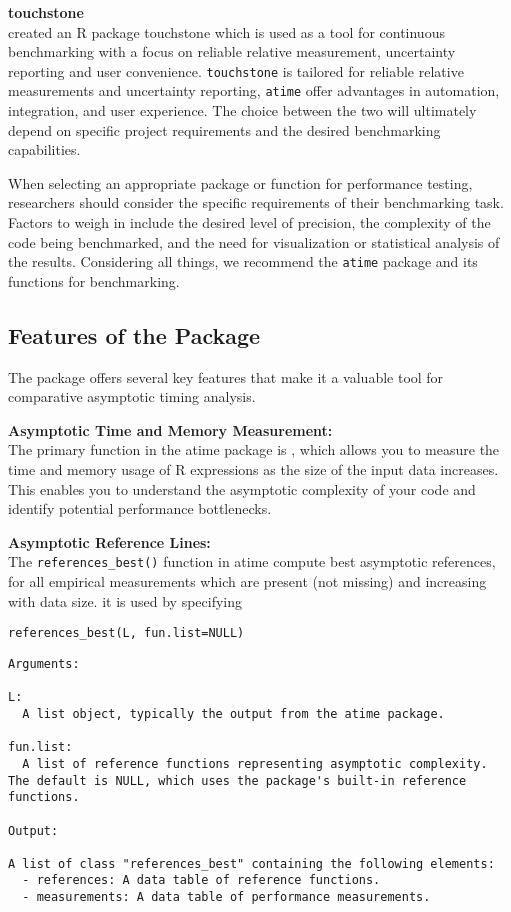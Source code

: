 \textbf{touchstone} \\
\citet{touchstone} created an R package touchstone which is used as a tool for continuous benchmarking with a focus on reliable relative measurement, uncertainty reporting and user convenience. \texttt{touchstone} is tailored for reliable relative measurements and uncertainty reporting, \texttt{atime} offer advantages in automation, integration, and user experience. The choice between the two will ultimately depend on specific project requirements and the desired benchmarking capabilities.

    
\noindent When selecting an appropriate package or function for performance testing, researchers should consider the specific requirements of their benchmarking task. Factors to weigh in include the desired level of precision, the complexity of the code being benchmarked, and the need for visualization or statistical analysis of the results. Considering all things, we recommend the \texttt{atime} package and its functions for benchmarking.

\subsection{Features of the Package}
The package offers several key features that make it a valuable tool for comparative asymptotic timing analysis.

\textbf{Asymptotic Time and Memory Measurement:} \\
The primary function in the atime package is , which allows you to measure the time and memory usage of R expressions as the size of the input data increases. This enables you to understand the asymptotic complexity of your code and identify potential performance bottlenecks.
\vspace{0.1in}

\textbf{Asymptotic Reference Lines:} \\
The \texttt{references\_best()} function in atime compute best asymptotic references, for all empirical measurements which are present (not missing) and increasing with data size. it is used by specifying

\texttt{references\_best(L, fun.list=NULL)}


\begin{lstlisting}
Arguments:

L: 
  A list object, typically the output from the atime package.

fun.list: 
  A list of reference functions representing asymptotic complexity. The default is NULL, which uses the package's built-in reference functions.

Output:

A list of class "references_best" containing the following elements:
  - references: A data table of reference functions.
  - measurements: A data table of performance measurements.
  
\end{lstlisting}



